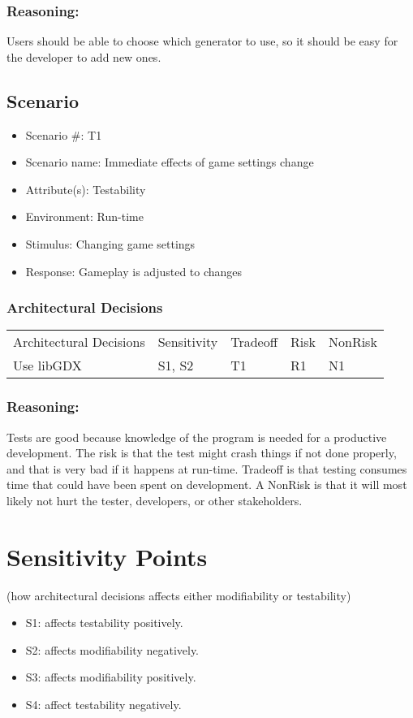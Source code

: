 \documentclass[12pt, a4paper]{article}
\begin{document}
\subsubsection{Reasoning:}
Users should be able to choose which generator to use, so it should be easy for
the developer to add new ones.

\subsection{Scenario}
\begin{itemize}
	\item Scenario #: T1
    \item Scenario name: Immediate effects of game settings change
    \item Attribute(s): Testability
    \item Environment: Run-time
    \item Stimulus: Changing game settings
    \item Response: Gameplay is adjusted to changes
\end{itemize}

\subsubsection{Architectural Decisions}
\begin{tabular}{ p{} p{} p{}
p{} p{} }
Architectural Decisions & Sensitivity & Tradeoff & Risk & NonRisk \\
Use libGDX & S1, S2 & T1 & R1 & N1 \\
\end{tabular}

\subsubsection{Reasoning:} 
Tests are good because knowledge of the program is needed for a productive
development. The risk is that the test might crash things if not done properly,
and that is very bad if it happens at run-time. Tradeoff is that testing
consumes time that could have been spent on development. A NonRisk is that it
will most likely not hurt the tester, developers, or other stakeholders.

\section{Sensitivity Points} 
(how architectural decisions affects either modifiability or testability)
\begin{itemize}
    \item S1: affects testability positively. 
    \item S2: affects modifiability negatively.
    \item S3: affects modifiability positively. 
    \item S4: affect testability negatively. 
\end{itemize}
\end{document}
